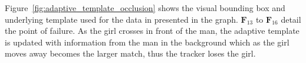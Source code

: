 Figure~\ref{fig:adaptive_template_occlusion} shows the visual bounding box and
underlying template used for the data in presented in the graph. $\mathbf{F}_{13}$ to
$\mathbf{F}_{16}$ detail the point of failure. As the girl crosses in front of
the man, the adaptive template is updated with information from the man in the
background which as the girl moves away becomes the larger match, thus the
tracker loses the girl. 


\begin{figure}     
\end{figure}
